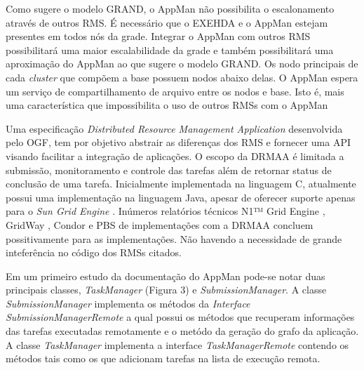 Como sugere o modelo GRAND, o AppMan não possibilita o escalonamento através de outros RMS. É necessário que o EXEHDA e o AppMan estejam presentes em todos nós da grade. Integrar o AppMan com outros RMS possibilitará uma maior escalabilidade da grade e também possibilitará uma aproximação do AppMan ao que sugere o modelo GRAND. Os nodo principais de cada {\it cluster} que compõem a base possuem nodos abaixo delas. O AppMan espera um serviço de compartilhamento de arquivo entre os nodos e base. Isto é, mais uma característica que impossibilita o uso de outros RMSs com o AppMan

Uma especificação {\it Distributed Resource Management Application} \cite{Rajic2002} desenvolvida pelo OGF, tem por objetivo abstrair as diferenças dos RMS e fornecer uma API visando facilitar a integração de aplicações. O escopo da DRMAA é limitada a submissão, monitoramento e controle das tarefas além de retornar status de conclusão de uma tarefa. Inicialmente implementada na linguagem C, atualmente possui uma implementação na linguagem Java, apesar de oferecer suporte apenas para o {\it Sun Grid Engine} \cite{Templeton}.
Inúmeros relatórios técnicos N1™ Grid Engine \cite{Templeton2006}, GridWay \cite{Herrera2007}, Condor \cite{Troeger2007} e PBS \cite{Ciesnik2007} de implementações com a DRMAA concluem possitivamente para as implementações. Não havendo a necessidade de grande inteferência no código dos RMSs citados.

Em um primeiro estudo da documentação do AppMan pode-se notar duas principais classes, {\it TaskManager} (Figura 3) e {\it SubmissionManager}. A classe {\it SubmissionManager} implementa os métodos da {\it Interface SubmissionManagerRemote} a qual possui os métodos que recuperam informações das tarefas executadas remotamente e o metódo da geração do grafo da aplicação. A classe {\it TaskManager } implementa a interface {\it TaskManagerRemote} contendo os métodos tais como os que adicionam tarefas na lista de execução remota.

